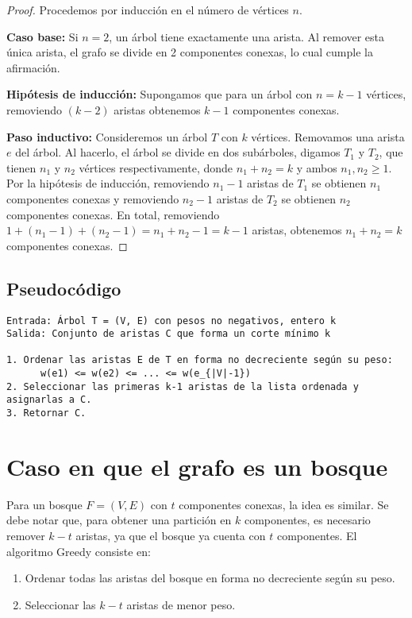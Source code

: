 \begin{proof}
Procedemos por inducción en el número de vértices \( n \).

\textbf{Caso base:}  
Si \( n = 2 \), un árbol tiene exactamente una arista. Al remover esta única arista, el grafo se divide en 2 componentes conexas, lo cual cumple la afirmación.

\textbf{Hipótesis de inducción:}  
Supongamos que para un árbol con \( n = k-1 \) vértices, removiendo \( (k-2) \) aristas obtenemos \( k-1 \) componentes conexas.

\textbf{Paso inductivo:}  
Consideremos un árbol \( T \) con \( k \) vértices. Removamos una arista \( e \) del árbol. Al hacerlo, el árbol se divide en dos subárboles, digamos \( T_1 \) y \( T_2 \), que tienen \( n_1 \) y \( n_2 \) vértices respectivamente, donde \( n_1 + n_2 = k \) y ambos \( n_1, n_2 \ge 1 \).  
Por la hipótesis de inducción, removiendo \( n_1 - 1 \) aristas de \( T_1 \) se obtienen \( n_1 \) componentes conexas y removiendo \( n_2 - 1 \) aristas de \( T_2 \) se obtienen \( n_2 \) componentes conexas.  
En total, removiendo \( 1 + (n_1 - 1) + (n_2 - 1) = n_1 + n_2 - 1 = k - 1 \) aristas, obtenemos \( n_1 + n_2 = k \) componentes conexas.  
\end{proof}

\subsection{Pseudocódigo}

\begin{lstlisting}
Entrada: Árbol T = (V, E) con pesos no negativos, entero k
Salida: Conjunto de aristas C que forma un corte mínimo k

1. Ordenar las aristas E de T en forma no decreciente según su peso: 
      w(e1) <= w(e2) <= ... <= w(e_{|V|-1})
2. Seleccionar las primeras k-1 aristas de la lista ordenada y asignarlas a C.
3. Retornar C.
\end{lstlisting}

\section{Caso en que el grafo es un bosque}

Para un bosque \( F = (V,E) \) con \( t \) componentes conexas, la idea es similar. Se debe notar que, para obtener una partición en \( k \) componentes, es necesario remover \( k-t \) aristas, ya que el bosque ya cuenta con \( t \) componentes. El algoritmo Greedy consiste en:
\begin{enumerate}
    \item Ordenar todas las aristas del bosque en forma no decreciente según su peso.
    \item Seleccionar las \( k-t \) aristas de menor peso.
\end{enumerate}

